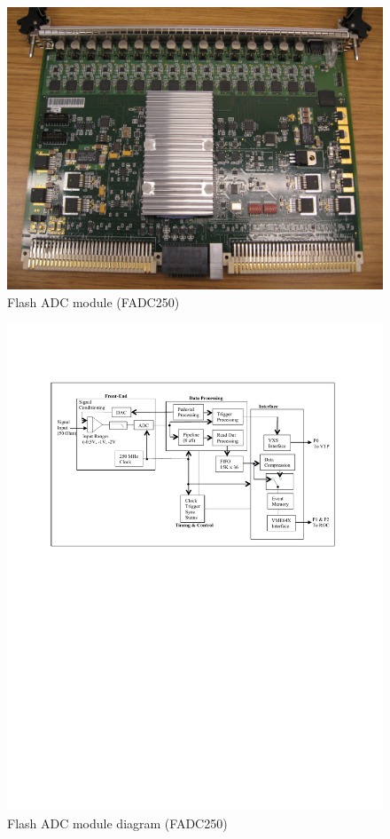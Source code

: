 \begin{figure}[hbt]
	\centering
	\includegraphics[width=1.0\columnwidth,keepaspectratio]{img/FADC250pic.jpg}
	\caption{Flash ADC module (FADC250)}
	\label{fig:FADC250pic}
\end{figure}

\begin{figure}[hbt]
	\centering
	\includegraphics[width=1.0\columnwidth,keepaspectratio]{img/FADC250_Diagram.pdf}
	\caption{Flash ADC module diagram (FADC250)}
	\label{fig:FADC250_board}
\end{figure}

